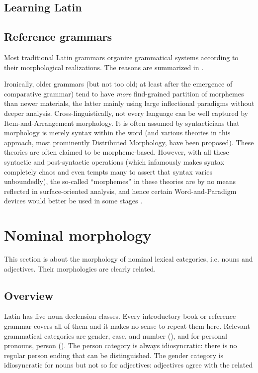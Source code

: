 \documentclass{article}
\begin{document}
\subsection{Learning Latin}

\subsection{Reference grammars}

Most traditional Latin grammars organize grammatical systems according to their morphological realizations.
The reasons are summarized in .

Ironically, older grammars (but not too old; at least after the emergence of comparative grammar)
tend to have \emph{more} find-grained partition of morphemes than newer materials,
the latter mainly using large inflectional paradigms without deeper analysis.
Cross-linguistically, not every language can be well captured by Item-and-Arrangement morphology.
It is often assumed by syntacticians that morphology is merely syntax within the word 
(and various theories in this approach, most prominently Distributed Morphology, have been proposed).
These theories are often claimed to be morpheme-based.
However, with all these syntactic and post-syntactic operations 
(which infamously makes syntax completely chaos and even tempts many to assert that syntax varies unboundedly),
the so-called ``morphemes'' in these theories are by no means reflected in surface-oriented analysis,
and hence certain Word-and-Paradigm devices would better be used in some stages \citep{anderson2017words}.

\section{Nominal morphology}\label{sec:nominal-morphology}

This section is about the morphology of nominal lexical categories, i.e. nouns and adjectives.
Their morphologies are clearly related.

\subsection{Overview}

Latin has five noun declension classes.
Every introductory book or reference grammar covers all of them and it makes no sense to repeat them here.
Relevant grammatical categories are gender, case, and number (), 
and for personal pronouns, person ().
The person category is always idiosyncratic:
there is no regular person ending that can be distinguished.
The gender category is idiosyncratic for nouns but not so for adjectives:
adjectives agree with the related %
\end{document}
